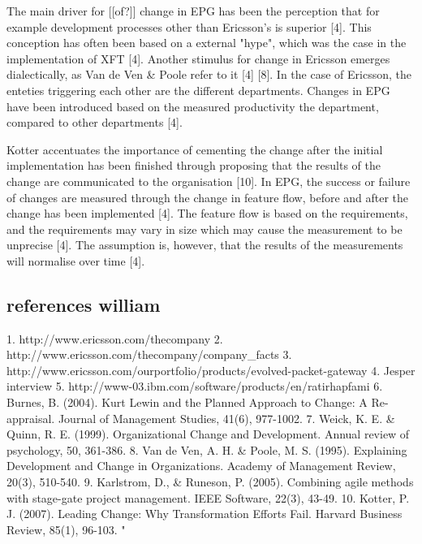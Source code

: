 \documentclass[final_report_innit.tex]{subfiles}
\begin{document}
The main driver for [[of?]] change in EPG has been the perception that for example development processes other than Ericsson's is superior [4]. This conception has often been based on a external "hype", which was the case in the implementation of XFT [4]. Another stimulus for change in Ericsson emerges dialectically, as Van de Ven \& Poole refer to it [4] [8]. In the case of Ericsson, the enteties triggering each other are the different departments. Changes in EPG have been introduced based on the measured productivity the department, compared to other departments [4]. 

Kotter accentuates the importance of cementing the change after the initial implementation has been finished through proposing that the results of the change are communicated to the organisation [10]. In EPG, the success or failure of changes are measured through the change in feature flow, before and after the change has been implemented [4]. The feature flow is based on the requirements, and the requirements may vary in size which may cause the measurement to be unprecise [4]. The assumption is, however, that the results of the measurements will normalise over time [4].   


\subsection*{references william}
1. http://www.ericsson.com/thecompany 
2. http://www.ericsson.com/thecompany/company\_facts 
3. http://www.ericsson.com/ourportfolio/products/evolved-packet-gateway 
4. Jesper interview 
5. http://www-03.ibm.com/software/products/en/ratirhapfami 
6. Burnes, B. (2004). Kurt Lewin and the Planned Approach to Change: A Re-appraisal. Journal of Management Studies, 41(6), 977-1002.
7. Weick, K. E. \& Quinn, R. E. (1999). Organizational Change and Development. Annual review of psychology, 50, 361-386. 
8. Van de Ven, A. H. \& Poole, M. S. (1995). Explaining Development and Change in Organizations. Academy of Management Review, 20(3), 510-540. 
9. Karlstrom, D., \& Runeson, P. (2005). Combining agile methods with stage-gate project management. IEEE Software, 22(3), 43-49.
10. Kotter, P. J. (2007). Leading Change: Why Transformation Efforts Fail. Harvard Business Review, 85(1), 96-103. "
\end{document}
